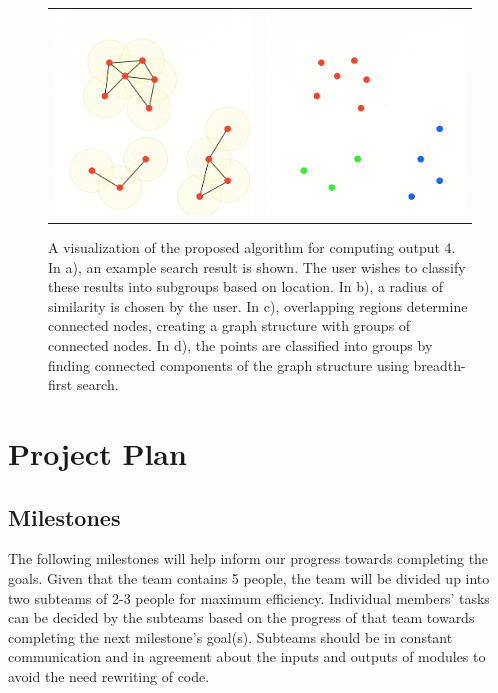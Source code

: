 \documentclass{article}
\begin{document}
\begin{figure}[p]
\begin{tabular}{ p{79mm}p{79mm} }
\includegraphics[width=78mm,frame=0.01cm]{Large/Fig3.png} & \includegraphics[width=78mm,frame=0.01cm]{Large/Fig4.png}
\end{tabular}
\caption{A visualization of the proposed algorithm for computing output 4. In a), an example search result is shown. The user wishes to classify these results into subgroups based on location. In b), a radius of similarity is chosen by the user. In c), overlapping regions determine connected nodes, creating a graph structure with groups of connected nodes. In d), the points are classified into groups by finding connected components of the graph structure using breadth-first search.}
\label{fig:Groupings}
\end{figure}

\clearpage
\section{Project Plan}
\subsection{Milestones}
The following milestones will help inform our progress towards completing the goals. Given that the team contains 5 people, the team will be divided up into two subteams of 2-3 people for maximum efficiency. Individual members' tasks can be decided by the subteams based on the progress of that team towards completing the next milestone's goal(s). Subteams should be in constant communication and in agreement about the inputs and outputs of modules to avoid the need rewriting of code.
\end{document}
